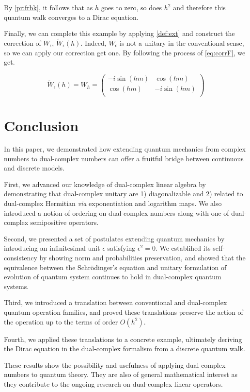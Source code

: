 \documentclass{article}
\newcommand{\e}{\epsilon}
\newcommand{\til}{\widetilde}
\begin{document}
By \ref{pr:frbk}, it follows that as $h$ goes to zero, so does $h^2$ and therefore this quantum walk converges to a Dirac equation.

Finally, we can complete this example by applying \ref{def:ext} and construct the correction of $W_\e$, $\til{W}_\e(h)$. Indeed, $W_\e$ is not a unitary in the conventional sense, so we can apply our correction get one. By following the process of \ref{eq:corrF}, we get.

\begin{equation}
\til{W}_\e(h) = W_h = \begin{pmatrix}
-i\sin(hm) & \cos(hm) \\
\cos(hm) & -i\sin(hm) \\
\end{pmatrix}
\end{equation}


\section{Conclusion}

In this paper, we demonstrated how extending quantum mechanics from complex numbers to dual-complex numbers can offer a fruitful bridge between continuous and discrete models.

First, we advanced our knowledge of dual-complex linear algebra by demonstrating that dual-complex unitary are 1) diagonalizable and 2) related to dual-complex Hermitian \textit{via} exponentiation and logarithm maps. We also introduced a notion of ordering on dual-complex numbers along with one of dual-complex semipositive operators.

Second, we presented a set of postulates extending quantum mechanics by introducing an infinitesimal unit $\e$ satisfying $\e^2 = 0$. We establihed its self-consistency by showing norm and probabilities preservation, and showed that the equivalence between the Schrödinger's equation and unitary formulation of evolution of quantum system continues to hold in dual-complex quantum systems.

Third, we introduced a translation between conventional and dual-complex quantum operation families, and proved these translations preserve the action of the operation up to the terms of order $O(h^2)$.

Fourth, we applied these translations to a concrete example, ultimately deriving the Dirac equation in the dual-complex formalism from a discrete quantum walk.

These results show the possibility and usefulness of applying dual-complex numbers to quantum theory. They are also of general mathematical interest as they contribute to the ongoing research on dual-complex linear operators.
\end{document}
